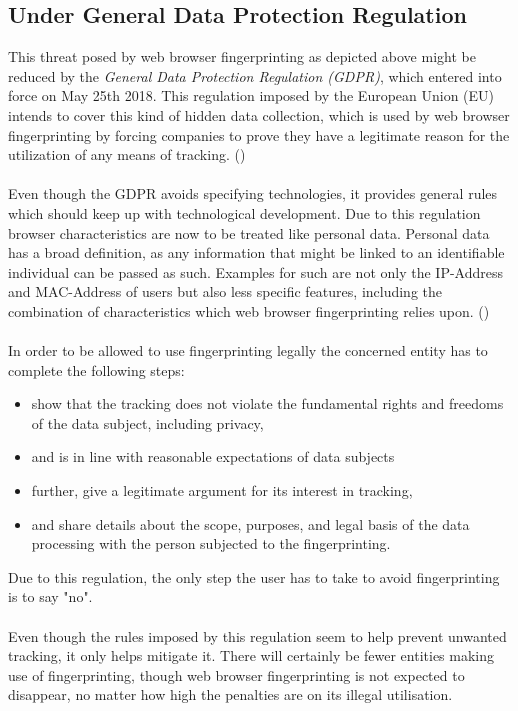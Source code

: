 \subsection{Under General Data Protection Regulation}
This threat posed by web browser fingerprinting as depicted above might be reduced by the \textit{General Data Protection Regulation (GDPR)}, which entered into force on May 25th 2018. This regulation imposed by the European Union (EU) intends to cover this kind of hidden data collection, which is used by web browser fingerprinting by forcing companies to prove they have a legitimate reason for the utilization of any means of tracking. (\textcite{miele18})\\\\
Even though the GDPR avoids specifying technologies, it provides general rules which should keep up with technological development. Due to this regulation browser characteristics are now to be treated like personal data. Personal data has a broad definition, as any information that might be linked to an identifiable individual can be passed as such. Examples for such are not only the IP-Address and MAC-Address of users but also less specific features, including the combination of characteristics which web browser fingerprinting relies upon. (\textcite{miele18})\\\\
In order to be allowed to use fingerprinting legally the concerned entity has to complete the following steps:
\begin{itemize}
	\item show that the tracking does not violate the fundamental rights and freedoms of the data subject, including privacy, 
	\item and is in line with reasonable expectations of data subjects
	\item further, give a legitimate argument for its interest in tracking,
	\item and share details about the scope, purposes, and legal basis of the data processing with the person subjected to the fingerprinting.
\end{itemize}
Due to this regulation, the only step the user has to take to avoid fingerprinting is to say "no".\\\\
Even though the rules imposed by this regulation seem to help prevent unwanted tracking, it only helps mitigate it. There will certainly be fewer entities making use of fingerprinting, though web browser fingerprinting is not expected to disappear, no matter how high the penalties are on its illegal utilisation.\\\\
